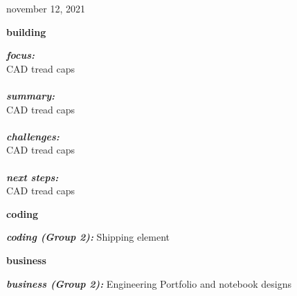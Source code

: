 \documentclass[16pt]{extarticle}
\begin{document}
\pagecolor{backgroundColor}

{\Huge november 12, 2021} \\

\begin{paracol}{3}

\begin{tcolorbox}[colback=buildBlue,colframe=white,coltext=textGrey]  
{\Large \textbf{building}}
\end{tcolorbox}

\begin{tcolorbox}[colback=buildBlue,colframe=white,coltext=textGrey]  
\textit{\textbf{focus: }} \\ CAD tread caps \\ \\
\textit{\textbf{summary: }} \\ CAD tread caps \\ \\
\textit{\textbf{challenges: }} \\ CAD tread caps \\ \\
\textit{\textbf{next steps: }} \\ CAD tread caps 
\end{tcolorbox}


\switchcolumn

\begin{tcolorbox}[colback=codeBlue,colframe=white,coltext=textGrey]  
{\Large \textbf{coding}}
\end{tcolorbox}

\begin{tcolorbox}[colback=codeBlue,colframe=white,coltext=textGrey]  
\textit{\textbf{coding (Group 2): }} Shipping element
\end{tcolorbox}

\switchcolumn

\begin{tcolorbox}[colback=businessBlue,colframe=white,coltext=textGrey]  
{\Large \textbf{business}}
\end{tcolorbox}

\begin{tcolorbox}[colback=businessBlue,colframe=white,coltext=textGrey]  
\textit{\textbf{business (Group 2): }}Engineering Portfolio and notebook designs
\end{tcolorbox}

\end{paracol}
\end{document}
